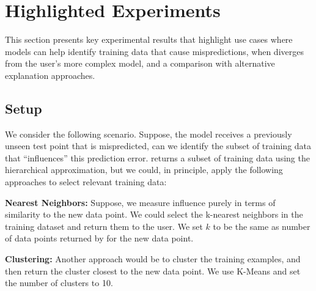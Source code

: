 \section{Highlighted Experiments}
This section presents key experimental results that highlight use cases where \sys models can help identify training data that cause mispredictions, 
when \sys diverges from the user's more complex model, and a comparison with alternative explanation approaches. 

\subsection{Setup}
We consider the following scenario. Suppose, the model receives a previously unseen test point that is mispredicted, can we identify the subset of training data that ``influences'' this prediction error. 
\sys returns a subset of training data using the hierarchical approximation, but we could, in principle, apply the following approaches to select relevant training data: 

\vspace{0.25em} \noindent \textbf{Nearest Neighbors: } Suppose, we measure influence purely in terms of similarity to the new data point. We could select the k-nearest neighbors in the training dataset and return them to the user. We set $k$ to be the same as number of data points returned by \sys for the new data point.

\vspace{0.25em} \noindent \textbf{Clustering: }
Another approach would be to cluster the training examples, and then return the cluster closest to the new data point. We use K-Means and set the number of clusters to 10. 

